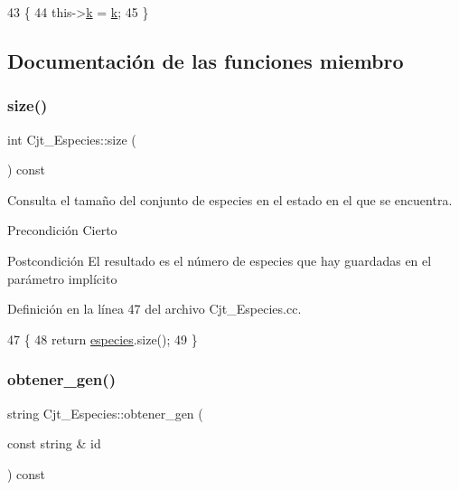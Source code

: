 \begin{DoxyCode}
43                                 \{
44   this->\hyperlink{class_cjt___especies_a4586fb4724b7af4b7f00bb0c0bdd6a17}{k} = \hyperlink{class_cjt___especies_a4586fb4724b7af4b7f00bb0c0bdd6a17}{k};
45 \}
\end{DoxyCode}


\subsection{Documentación de las funciones miembro}
\mbox{\label{class_cjt___especies_a7061cb2108f9be2b12b8f2c5ae99a82d}} 
\subsubsection{\texorpdfstring{size()}{size()}}
{\footnotesize\ttfamily int Cjt\+\_\+\+Especies\+::size (\begin{DoxyParamCaption}{ }\end{DoxyParamCaption}) const}



Consulta el tamaño del conjunto de especies en el estado en el que se encuentra. 

\begin{DoxyPrecond}{Precondición}
Cierto 
\end{DoxyPrecond}
\begin{DoxyPostcond}{Postcondición}
El resultado es el número de especies que hay guardadas en el parámetro implícito 
\end{DoxyPostcond}


Definición en la línea 47 del archivo Cjt\+\_\+\+Especies.\+cc.


\begin{DoxyCode}
47                              \{
48   \textcolor{keywordflow}{return} \hyperlink{class_cjt___especies_a8f319699bd2e8a42b85ec47b67c17563}{especies}.size();
49 \}
\end{DoxyCode}
\mbox{\label{class_cjt___especies_a4ac9513af2f0cfe4af1a75bb0d8ecf37}} 
\subsubsection{\texorpdfstring{obtener\+\_\+gen()}{obtener\_gen()}}
{\footnotesize\ttfamily string Cjt\+\_\+\+Especies\+::obtener\+\_\+gen (\begin{DoxyParamCaption}\item[{const string \&}]{id }\end{DoxyParamCaption}) const}



